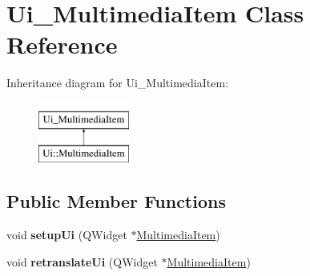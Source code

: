 \hypertarget{classUi__MultimediaItem}{}\section{Ui\+\_\+\+Multimedia\+Item Class Reference}
\label{classUi__MultimediaItem}
Inheritance diagram for Ui\+\_\+\+Multimedia\+Item\+:\begin{figure}[H]
\begin{center}
\leavevmode
\includegraphics[height=2.000000cm]{classUi__MultimediaItem}
\end{center}
\end{figure}
\subsection*{Public Member Functions}
\begin{DoxyCompactItemize}
\item 
void {\bfseries setup\+Ui} (Q\+Widget $\ast$\hyperlink{classMultimediaItem}{Multimedia\+Item})\hypertarget{classUi__MultimediaItem_a9499626d53b5fcf6ca82e39429639b4a}{}\label{classUi__MultimediaItem_a9499626d53b5fcf6ca82e39429639b4a}

\item 
void {\bfseries retranslate\+Ui} (Q\+Widget $\ast$\hyperlink{classMultimediaItem}{Multimedia\+Item})\hypertarget{classUi__MultimediaItem_a4d265f40582bbcebe8d52e543afde5f9}{}\label{classUi__MultimediaItem_a4d265f40582bbcebe8d52e543afde5f9}

\end{DoxyCompactItemize}
